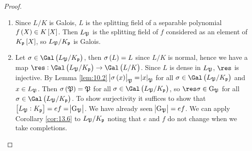 \begin{proof}
\hfill
\begin{enumerate}
\item Since $ L / K $ is Galois, $ L $ is the splitting field of a separable polynomial $ f\br{X} \in K\sbr{X} $. Then $ L_{\mathfrak{P}} $ is the splitting field of $ f $ considered as an element of $ K_\ppp\sbr{X} $, so $ L_{\mathfrak{P}} / K_{\mathfrak{p}} $ is Galois.
\item Let $ \sigma \in \Gal\br{L_\pp / K_\ppp} $, then $ \sigma\br{L} = L $ since $ L / K $ is normal, hence we have a map $ \res : \Gal\br{L_\pp / K_\ppp} \to \Gal\br{L / K} $. Since $ L $ is dense in $ L_{\mathfrak{P}} $, $ \res $ is injective. By Lemma \ref{lem:10.2} $ \abs{\sigma\br{x}}_\pp = \abs{x}_\pp $ for all $ \sigma \in \Gal\br{L_\pp / K_\ppp} $ and $ x \in L_{\mathfrak{P}} $. Then $ \sigma\br{\pp} = \pp $ for all $ \sigma \in \Gal\br{L_\pp / K_\ppp} $, so $ \res \sigma \in \G_\pp $ for all $ \sigma \in \Gal\br{L_\pp / K_\ppp} $. To show surjectivity it suffices to show that $ \sbr{L_\pp : K_\ppp} = ef = \abs{\G_\pp} $. We have already seen $ \abs{\mathrm{G}_{\mathfrak{P}}} = ef $. We can apply Corollary \ref{cor:13.6} to $ L_{\mathfrak{P}} / K_{\mathfrak{p}} $ noting that $ e $ and $ f $ do not change when we take completions.
\end{enumerate}
\end{proof}

